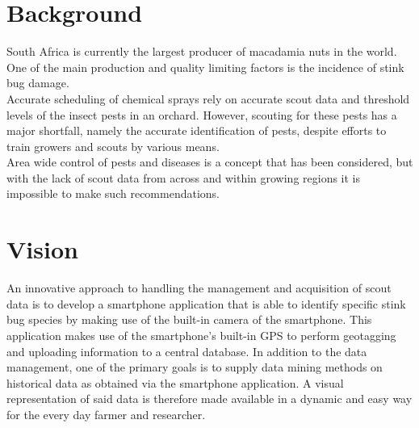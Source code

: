 \documentclass[11pt,a4paper,titlepage]{article}
\begin{document}
    


\tableofcontents

\pagebreak


\pagebreak


\section{Background}
South Africa is currently the largest producer of macadamia nuts in the world. One of the main production and quality limiting factors is the incidence of stink bug damage. 
\\Accurate scheduling of chemical sprays rely on accurate scout data and threshold levels of the insect pests in an orchard. However, scouting for these pests has
a major shortfall, namely the accurate identification of pests, despite efforts to train growers and scouts by various means.\\
Area wide control of pests and diseases is a concept that has been considered, but with the lack of scout data from across and within growing regions it is impossible to make such recommendations. \\

\section{Vision}
An innovative approach to handling the management and acquisition of scout data is to develop a smartphone application that is able to identify specific stink bug species by making use of the built-in camera of the smartphone. This application makes use of the smartphone’s built-in GPS to perform geotagging and uploading information to a central database. In addition to the data management, one of the primary goals is to supply data mining methods on historical data as obtained via the smartphone application. A visual representation of said data is therefore made available in a dynamic and easy way for the every day farmer and researcher.
\end{document}

